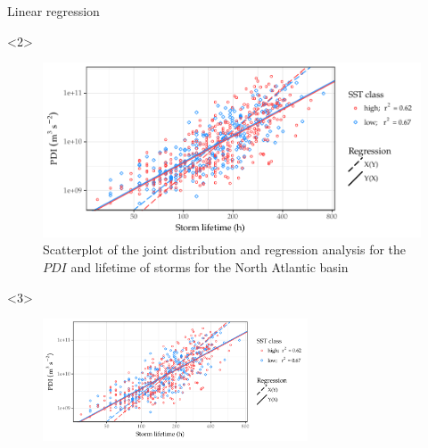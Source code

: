 \begin{frame}[label=intro-objectives]{Linear regression}
	\begin{onlyenv}
 		\begin{figure}[H]
 			\centering
 			\includegraphics[width=\textwidth]{images/scatterplot-natl}
 			\caption{Scatterplot of the joint distribution and regression analysis for the $PDI$ and lifetime of storms for the North Atlantic basin}
 			\label{fig:natl-scatterplot}
 		\end{figure}
	\end{onlyenv}

	\begin{onlyenv}
		\begin{figure}[H]
			\centering
			\includegraphics[width=0.7\textwidth]{images/scatterplot-natl}
		\end{figure}


\end{onlyenv}
\end{frame}
